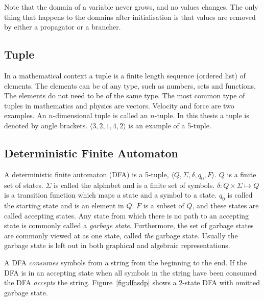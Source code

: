 \documentclass[a4paper,11pt]{article}
\begin{document}
Note that the domain of a variable never grows, and no values changes. The only thing that happens to the domains after initialisation is that values are removed by either a propagator or a brancher.

\subsection{Tuple}
In a mathematical context a tuple is a finite length sequence (ordered list) of elements. The elements can be of any type, such as numbers, sets and functions. The elements do not need to be of the same type. The most common type of tuples in mathematics and physics are vectors. Velocity and force are two examples. An $n$-dimensional tuple is called an $n$-tuple. In this thesis a tuple is denoted by angle brackets. $\langle 3, 2, 1, 4, 2 \rangle$ is an example of a 5-tuple.

\subsection{Deterministic Finite Automaton}
A deterministic finite automaton (DFA) is a 5-tuple, $\langle Q,\Sigma,\delta,q_0, F\rangle$. $Q$ is a finite set of states. $\Sigma$ is called the alphabet and is a finite set of symbols. $\delta : Q \times \Sigma \mapsto Q$  is a transition function which maps a state and a symbol to a state. $q_0$ is called the starting state and is an element in $Q$. $F$ is a subset of $Q$, and these states are called accepting states. Any state from which there is no path to an accepting state is commonly called a \textit{garbage state}. Furthermore, the set of garbage states are commonly viewed at as one state, called \textit{the} garbage state. Usually the garbage state is left out in both graphical and algebraic representations. 

A DFA \textit{consumes} symbols from a string from the beginning to the end. If the DFA is in an accepting state when all symbols in the string have been consumed the DFA \textit{accepts} the string. Figure~\ref{fig:dfasdp} shows a 2-state DFA with omitted garbage state.
\end{document}
